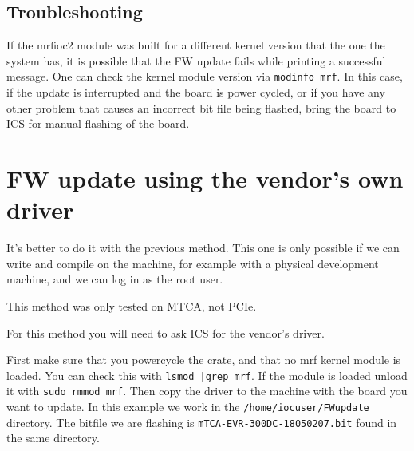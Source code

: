 \documentclass[11pt
  , a4paper
  , article
  , oneside
  , showtrims
]{memoir}
\begin{document}
\subsection{Troubleshooting}
If the mrfioc2 module was built for a different kernel version that the one the system has, it is possible that the FW update fails while printing a successful message. One can check the kernel module version via \texttt{modinfo mrf}. In this case, if the update is interrupted and the board is power cycled, or if you have any other problem that causes an incorrect bit file being flashed, bring the board to ICS for manual flashing of the board. 


\clearpage
\section{FW update using the vendor's own driver}
It's better to do it with the previous method. This one is only possible if we can write and compile on the machine, for example with a physical development machine, and we can log in as the root user.

This method was only tested on MTCA, not PCIe.

For this method you will need to ask ICS for the vendor's driver.

First make sure that you powercycle the crate, and that no mrf kernel module is loaded. You can check this with \texttt{lsmod |grep mrf}. If the module is loaded unload it with \texttt{sudo rmmod mrf}. Then copy the driver to the machine with the board you want to update. In this example we work in the \texttt{/home/iocuser/FWupdate} directory. The bitfile we are flashing is \texttt{mTCA-EVR-300DC-18050207.bit} found in the same directory.
\end{document}
